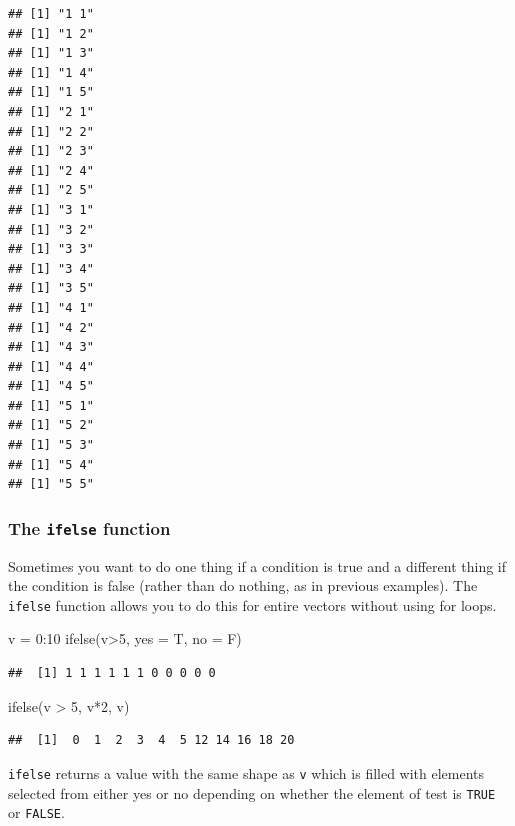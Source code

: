 \documentclass[
]{book}
\newenvironment{Shaded}{\begin{snugshade}}{\end{snugshade}}
\newcommand{\AttributeTok}[1]{\textcolor[rgb]{0.77,0.63,0.00}{#1}}
\newcommand{\DecValTok}[1]{\textcolor[rgb]{0.00,0.00,0.81}{#1}}
\newcommand{\FunctionTok}[1]{\textcolor[rgb]{0.00,0.00,0.00}{#1}}
\newcommand{\NormalTok}[1]{#1}
\newcommand{\OtherTok}[1]{\textcolor[rgb]{0.56,0.35,0.01}{#1}}
\newcommand{\SpecialCharTok}[1]{\textcolor[rgb]{0.00,0.00,0.00}{#1}}
\begin{document}
\begin{verbatim}
## [1] "1 1"
## [1] "1 2"
## [1] "1 3"
## [1] "1 4"
## [1] "1 5"
## [1] "2 1"
## [1] "2 2"
## [1] "2 3"
## [1] "2 4"
## [1] "2 5"
## [1] "3 1"
## [1] "3 2"
## [1] "3 3"
## [1] "3 4"
## [1] "3 5"
## [1] "4 1"
## [1] "4 2"
## [1] "4 3"
## [1] "4 4"
## [1] "4 5"
## [1] "5 1"
## [1] "5 2"
## [1] "5 3"
## [1] "5 4"
## [1] "5 5"
\end{verbatim}

\hypertarget{the-ifelse-function}{%
\subsubsection{\texorpdfstring{The \texttt{ifelse} function}{The ifelse function}}\label{the-ifelse-function}}

Sometimes you want to do one thing if a condition is true and a different thing if the condition is false (rather than do nothing, as in previous examples). The \texttt{ifelse} function allows you to do this for entire vectors without using for loops.

\begin{Shaded}
\begin{Highlighting}[]
\NormalTok{v }\OtherTok{=} \DecValTok{0}\SpecialCharTok{:}\DecValTok{10}
\FunctionTok{ifelse}\NormalTok{(v}\SpecialCharTok{\textgreater{}}\DecValTok{5}\NormalTok{, }\AttributeTok{yes =}\NormalTok{ T, }\AttributeTok{no =}\NormalTok{ F)}
\end{Highlighting}
\end{Shaded}

\begin{verbatim}
##  [1] 1 1 1 1 1 1 0 0 0 0 0
\end{verbatim}

\begin{Shaded}
\begin{Highlighting}[]
\FunctionTok{ifelse}\NormalTok{(v }\SpecialCharTok{\textgreater{}} \DecValTok{5}\NormalTok{, v}\SpecialCharTok{*}\DecValTok{2}\NormalTok{, v)}
\end{Highlighting}
\end{Shaded}

\begin{verbatim}
##  [1]  0  1  2  3  4  5 12 14 16 18 20
\end{verbatim}

\texttt{ifelse} returns a value with the same shape as \texttt{v} which is filled with elements selected from either yes or no depending on whether the element of test is \texttt{TRUE} or \texttt{FALSE}.
\end{document}

